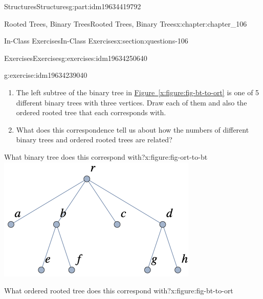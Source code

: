 \documentclass[oneside,10pt,]{book}
\newcommand{\xreffont}{\relax}
\numberwithin{equation}{section}
\begin{document}
\begin{partptx}{Structures}{}{Structures}{}{}{g:part:idm19634419792}
\begin{chapterptx}{Rooted Trees, Binary Trees}{}{Rooted Trees, Binary Trees}{}{}{x:chapter:chapter_106}
\begin{sectionptx}{In-Class Exercises}{}{In-Class Exercises}{}{}{x:section:questions-106}
\begin{exercises-subsection-numberless}{Exercises}{}{Exercises}{}{}{g:exercises:idm19634250640}
\begin{exercisegroup}
\begin{divisionexerciseeg}{5}{}{}{g:exercise:idm19634239040}
\begin{enumerate}[label=(\alph*)]
\item{}The left subtree of the binary tree in \hyperref[x:figure:fig-bt-to-ort]{Figure~{\xreffont\ref{x:figure:fig-bt-to-ort}}} is one of 5 different binary trees with three vertices.  Draw each of them and also the ordered rooted tree that each corresponds with.%
\item{}What does this correspondence tell us about how the numbers of different binary trees and ordered rooted trees are related?%
\end{enumerate}
%
\begin{sidebyside}{2}{0}{0}{0}%
\begin{sbspanel}{0.5}%
\begin{figureptx}{What binary tree does this correspond with?}{x:figure:fig-ort-to-bt}{}%
\includegraphics[width=\linewidth]{images/fig-ort-to-bt.png}
\tcblower
\end{figureptx}%
\end{sbspanel}%
\begin{sbspanel}{0.5}%
\begin{figureptx}{What ordered rooted tree does this correspond with?}{x:figure:fig-bt-to-ort}{}%

\end{figureptx}
\end{sbspanel}
\end{sidebyside}
\end{divisionexerciseeg}
\end{exercisegroup}
\end{exercises-subsection-numberless}
\end{sectionptx}
\end{chapterptx}
\end{partptx}
\end{document}
